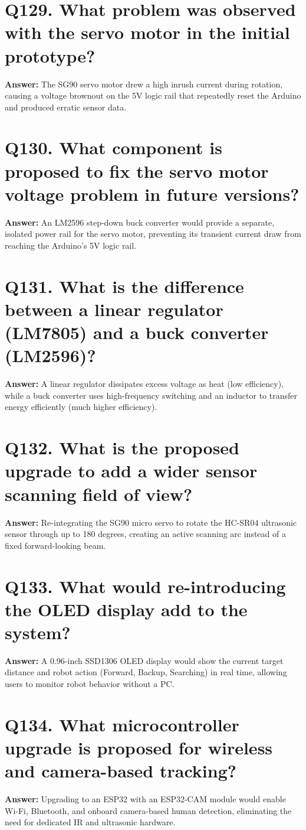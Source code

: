 \documentclass[12pt,a4paper,oneside]{report}
\begin{document}
\section{Q129. What problem was observed with the servo motor in the initial prototype?}
\textbf{Answer:} The SG90 servo motor drew a high inrush current during rotation, causing a voltage brownout on the 5V logic rail that repeatedly reset the Arduino and produced erratic sensor data.

\section{Q130. What component is proposed to fix the servo motor voltage problem in future versions?}
\textbf{Answer:} An LM2596 step-down buck converter would provide a separate, isolated power rail for the servo motor, preventing its transient current draw from reaching the Arduino's 5V logic rail.

\section{Q131. What is the difference between a linear regulator (LM7805) and a buck converter (LM2596)?}
\textbf{Answer:} A linear regulator dissipates excess voltage as heat (low efficiency), while a buck converter uses high-frequency switching and an inductor to transfer energy efficiently (much higher efficiency).

\section{Q132. What is the proposed upgrade to add a wider sensor scanning field of view?}
\textbf{Answer:} Re-integrating the SG90 micro servo to rotate the HC-SR04 ultrasonic sensor through up to 180 degrees, creating an active scanning arc instead of a fixed forward-looking beam.

\section{Q133. What would re-introducing the OLED display add to the system?}
\textbf{Answer:} A 0.96-inch SSD1306 OLED display would show the current target distance and robot action (Forward, Backup, Searching) in real time, allowing users to monitor robot behavior without a PC.

\section{Q134. What microcontroller upgrade is proposed for wireless and camera-based tracking?}
\textbf{Answer:} Upgrading to an ESP32 with an ESP32-CAM module would enable Wi-Fi, Bluetooth, and onboard camera-based human detection, eliminating the need for dedicated IR and ultrasonic hardware.
\end{document}
